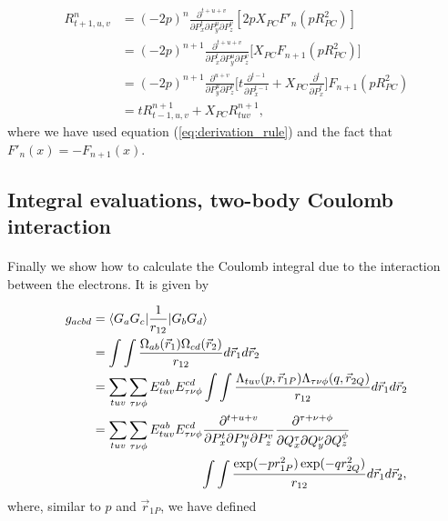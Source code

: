 \documentclass[%
twoside,                 %
final,                   %
10pt]{article}
\begin{document}
\begin{align}
 R^{n}_{t+1,u,v} & = (-2p)^n\frac{\partial^{t+u+v}}{\partial P_x^t \partial P_y^u \partial P_z^v} [2pX_{PC}F'_n(pR_{PC}^2)] \\
                 & = (-2p)^{n+1}\frac{\partial^{t+u+v}}{\partial P_x^t\partial P_y^u \partial P_z^v}\Big[X_{PC}F_{n+1}(pR_{PC}^2)\Big] \\
                 & = (-2p)^{n+1}\frac{\partial^{u+v}}{\partial P_y^u \partial P_z^v}\Big[t\frac{\partial^{t-1}}{\partial P_x^{t-1}} + X_{PC}\frac{\partial^t}{\partial P_x^t}\Big]F_{n+1}(pR_{PC}^2) \\
                 & = tR^{n+1}_{t-1,u,v} + X_{PC}R^{n+1}_{tuv},
\end{align}
where we have used equation (\ref{eq:derivation_rule}) and the fact that $F'_n(x) = -F_{n+1}(x)$.



\subsection*{Integral evaluations, two-body Coulomb interaction}

\paragraph{}

Finally we show how to calculate the Coulomb integral due to the interaction between the electrons. It is given by

\begin{equation}
\begin{split}
  g_{acbd} & = \langle G_a G_c\vert \frac{1}{r_{12}}\vert G_b G_d\rangle \\
           & = \int\int \frac{\Omega_{ab}(\vec r_1)\Omega_{cd}(\vec r_2)}{r_{12}} d\vec r_1 d\vec r_2 \\
           & = \sum_{tuv}\sum_{\tau\nu\phi}E^{ab}_{tuv}E^{cd}_{\tau\nu\phi}\int\int\frac{\Lambda_{tuv}(p,\vec r_{1P})\Lambda_{\tau\nu\phi}(q,\vec r_{2Q})}{r_{12}}d \vec r_1 d\vec r_2 \\
           & = \sum_{tuv}\sum_{\tau\nu\phi}E^{ab}_{tuv}E^{cd}_{\tau\nu\phi}\frac{\partial^{t+u+v}}{\partial P_x^t \partial P_y^u \partial P_z^v}
                \frac{\partial^{\tau+\nu+\phi}}{\partial Q_x^\tau \partial Q_y^\nu \partial Q_z^\phi} \\
           &    \hspace{30mm} \int\int\frac{\exp(-pr^2_{1P})\exp(-qr^2_{2Q})}{r_{12}}d \vec r_1 d\vec r_2,
\end{split}
\end{equation}
where, similar to $p$ and $\vec r_{1P}$, we have defined
\end{document}
